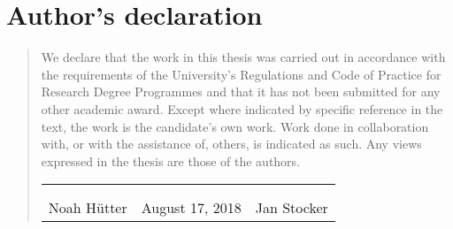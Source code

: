\chapter*{Author's declaration}
\begin{SingleSpace}
\begin{quote}
We declare that the work in this thesis was carried out in accordance with
the requirements of  the University's Regulations and Code of Practice for
Research Degree Programmes and that it  has not been submitted for any other
academic award. Except where indicated by specific  reference in the text, the
work is the candidate's own work. Work done in collaboration with, or with the
assistance of, others, is indicated as such. Any views expressed in the
thesis are those of the authors.

\vspace{3cm}

\begin{table}[h!]
    \centering
    \begin{tabular}{p{5cm} p{3cm} p{5cm}}
         & & \\ \cline{1-1} \cline{3-3} 
        \vspace{1ex} & & \\
        \multicolumn{1}{c}{Noah H\"utter} &
        August 17, 2018
         & \multicolumn{1}{c}{Jan Stocker} \\
    \end{tabular}
\end{table}




\end{quote}
\end{SingleSpace}
\clearpage